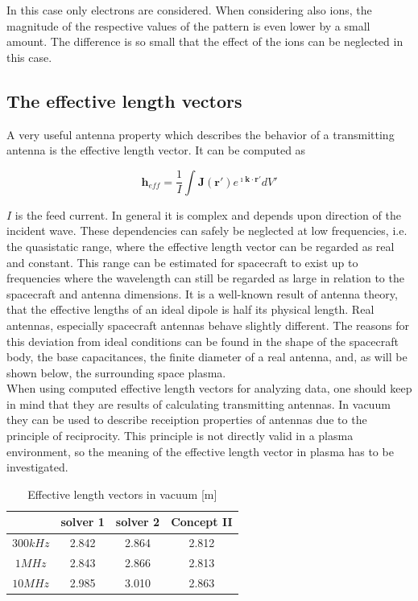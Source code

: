 \documentclass[two-coloumn,ras]{agutex}
\begin{document}
\begin{article}
In this case only electrons are considered. When considering also ions, the magnitude of the respective values of the pattern is even lower by a small amount. The difference is so small that the effect of the ions can be neglected in this case.

\subsection{The effective length vectors}
A very useful antenna property which describes the behavior of a transmitting antenna is the effective length vector. It can be computed as

\begin{equation}\label{eq:heff}
\textbf{h}_{eff}=\frac{1}{I}\int \mathbf{J}(\mathbf{r}')e^{\imath \mathbf{k} \cdot \mathbf{r}'} dV'
 \end{equation}

$I$ is the feed current. In general it is complex and depends upon direction of the incident wave. These dependencies can safely be neglected at low frequencies, i.e. the quasistatic range, where the effective length vector can be regarded as real and constant. This range can be estimated for spacecraft to exist up to frequencies where the wavelength can still be regarded as large in relation to the spacecraft and antenna dimensions. It is a well-known result of antenna theory, that the effective lengths of an ideal dipole is half its physical length. Real antennas, especially spacecraft antennas behave slightly different. The reasons for this deviation from ideal conditions can be found in the shape of the spacecraft body, the base capacitances, the finite diameter of a real antenna, and, as will be shown below, the surrounding space plasma.\\

When using computed effective length vectors for analyzing data, one should keep in mind that they are results of calculating transmitting antennas. In vacuum they can be used to describe receiption properties of antennas due to the principle of reciprocity. This principle is not directly valid in a plasma environment, so the meaning of the effective length vector in plasma has to be investigated.\\


\begin{table}
\caption{Effective length vectors in vacuum [m]}
\label{tab:heff_vacuum}
\begin{tabular}{|c|c|c|c|}
 \hline
 & solver 1  & solver 2  & Concept II \\
\hline
$300 kHz$ & 2.842 & 2.864 & 2.812 \\
$1 MHz$ & 2.843 & 2.866 &  2.813 \\
$10 MHz$ & 2.985 & 3.010 &  2.863  \\
\hline
\end{tabular}
\end{table}


\end{article}
\end{document}
